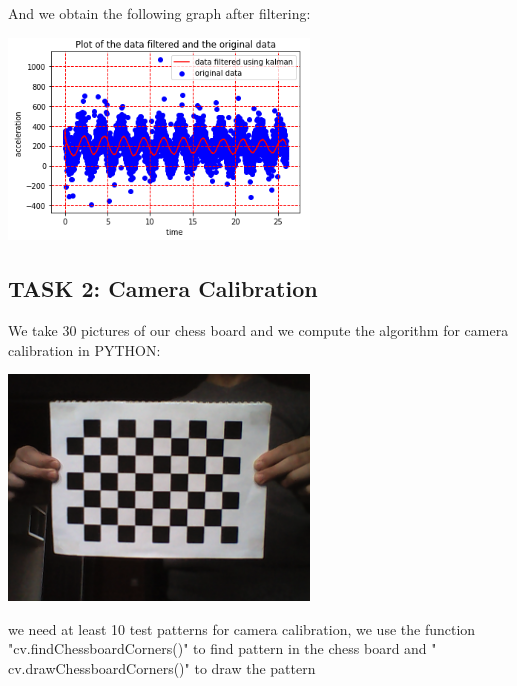 \documentclass[12pt,a4paper]{report}
\begin{document}
And we obtain the following graph after filtering:

\begin{center}
\includegraphics[width=8cm]{Capture2.png}
\end{center}

\subsection{TASK 2: Camera Calibration}
We take 30 pictures of our chess board and we compute the algorithm for camera calibration in PYTHON:

\begin{center}
\includegraphics[width=8cm]{Capture6.png}
\end{center}

we need at least 10 test patterns for camera calibration, we use the function  "cv.findChessboardCorners()" to find pattern in the chess board and  " cv.drawChessboardCorners()" to draw the pattern 
\end{document}
